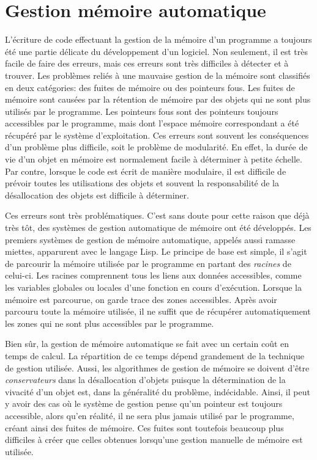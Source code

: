 \documentclass[12pt,twoside,letterpaper,francais]{book}
\begin{document}
\section{Gestion mémoire automatique}
L'écriture de code effectuant la gestion de la mémoire d'un programme
a toujours été une partie délicate du dévelop\-pement d'un logiciel. Non
seulement, il est très facile de faire des erreurs, mais ces erreurs
sont très difficiles à détecter et à trouver. Les problèmes reliés à
une mauvaise gestion de la mémoire sont classifiés en deux catégories:
des fuites de mémoire ou des pointeurs fous. Les fuites de mémoire
sont causées par la rétention de mémoire par des objets qui ne sont
plus utilisés par le programme. Les pointeurs fous sont des pointeurs
toujours accessibles par le programme, mais dont l'espace mémoire
correspondant a été récupéré par le système d'exploitation. Ces
erreurs sont souvent les conséquences d'un problème plus difficile,
soit le problème de modularité. En effet, la durée de vie d'un objet
en mémoire est normalement facile à déterminer à petite échelle. Par
contre, lorsque le code est écrit de manière modulaire, il est
difficile de prévoir toutes les utilisations des objets et souvent la
responsabilité de la désallocation des objets est difficile à
déterminer.

Ces erreurs sont très problématiques. C'est sans doute pour cette
raison que déjà très tôt, des systèmes de gestion automatique de
mémoire ont été développés. Les premiers systèmes de gestion de
mémoire automatique, appelés aussi ramasse miettes, apparurent avec le
langage Lisp. Le principe de base est simple, il s'agit de parcourir
la mémoire utilisée par le programme en partant des \emph{racines} de
celui-ci. Les racines comprennent tous les liens aux données
accessibles, comme les variables globales ou locales d'une fonction en
cours d'exécution. Lorsque la mémoire est parcourue, on garde trace
des zones accessibles. Après avoir parcouru toute la mémoire utilisée,
il ne suffit que de récupérer automatiquement les zones qui ne sont
plus accessibles par le programme.

Bien sûr, la gestion de mémoire automatique se fait avec un certain
coût en temps de calcul. La répartition de ce temps dépend grandement
de la technique de gestion utilisée. Aussi, les algorithmes de gestion
de mémoire se doivent d'être \emph{conservateurs} dans la
désallocation d'objets puisque la détermination de la vivacité d'un
objet est, dans la généralité du problème, indécidable. Ainsi, il peut
y avoir des cas où le système de gestion pense qu'un pointeur est
toujours accessible, alors qu'en réalité, il ne sera plus jamais
utilisé par le programme, créant ainsi des fuites de mémoire. Ces
fuites sont toutefois beaucoup plus difficiles à créer que celles
obtenues lorsqu'une gestion manuelle de mémoire est utilisée.
\end{document}
